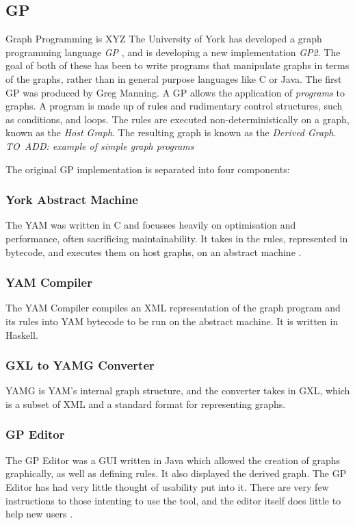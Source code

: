 \documentclass{UoYCSproject}
\begin{document}
\subsection{GP}
Graph Programming is XYZ
The University of York has developed a graph programming language \emph{GP} \cite{gp1}, and is developing a new implementation \emph{GP2}. The goal of both of these has been to write programs that manipulate graphs in terms of the graphs, rather than in general purpose languages like C or Java. The first GP was produced by Greg Manning. 
A GP allows the application of \emph{programs} to graphs. A program is made up of rules and rudimentary control structures, such as conditions, and loops. The rules are executed non-deterministically on a graph, known as the \emph{Host Graph}. The resulting graph is known as the \emph{Derived Graph}.
\emph{TO~ADD: example of simple graph programs} %

The original GP implementation is separated into four components:
\subsubsection{York Abstract Machine}
The YAM was written in C and focusses heavily on optimisation and performance, often sacrificing maintainability. It takes in the rules, represented in bytecode, and executes them on host graphs, on an abstract machine \cite[p. 13]{gp2_ide}.
\subsubsection{YAM Compiler}
The YAM Compiler compiles an XML representation of the graph program and its rules into YAM bytecode to be run on the abstract machine. It is written in Haskell.
\subsubsection{GXL to YAMG Converter}
YAMG is YAM's internal graph structure, and the converter takes in GXL, which is a subset of XML and a standard format for representing graphs.
\subsubsection{GP Editor}
The GP Editor was a GUI written in Java which allowed the creation of graphs graphically, as well as defining rules. It also displayed the derived graph.
The GP Editor has had very little thought of usability put into it\cite[p. 35]{gp_ge}. There are very few instructions to those intenting to use the tool, and the editor itself does little to help new users \cite[p. 44, 45]{gp_ui}.
\end{document}
